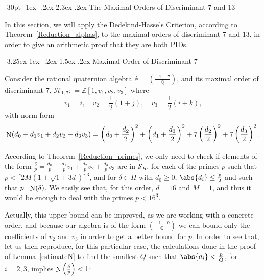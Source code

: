 \documentclass[10pt]{article}
\makeatletter
\renewcommand\section{\@startsection {section}{1}{\z@} {-30pt \@plus
    -1ex \@minus -.2ex} {2.3ex \@plus.2ex}
  {\normalfont\normalsize\bfseries\boldmath}}
\renewcommand\subsection{\@startsection{subsection}{2}{\z@}
  {-3.25ex\@plus -1ex \@minus -.2ex} {1.5ex \@plus .2ex}
  {\normalfont\normalsize\bfseries\boldmath}}
\theoremstyle{definition}
\newcommand\A{\mathbb{A}}
\newcommand\QQ{\mathbb{Q}}
\newcommand\ZZ{\mathbb{Z}}
\newcommand\hh{\mathcal{H}}
\newcommand\SC{\mathcal{S}}
\newcommand\N{\mathop{\rm N}\nolimits}
\makeatother
\begin{document}
\section{The Maximal Orders of Discriminant 7 and
  13}\label{orders7and13}

In this section, we will apply the Dedekind-Hasse's Criterion,
according to Theorem~\ref{Reduction_alphas}, to the maximal orders of
discriminant 7 and 13, in order to give an arithmetic proof that they
are both PIDs.

\subsection{Maximal Order of Discriminant 7}

Consider the rational quaternion algebra
$\A = \left( \frac{-1,-7}{\QQ} \right)$, and its maximal order of
discriminant 7, $\hh_{1,7} ;= \ZZ[1, v_1,v_2,v_3]$ where
\[ v_1= i, \quad v_2 = \frac{1}{2} (1+j), \quad v_3 =
  \frac{1}{2}(i+k),\] with norm form
%
\small
\[ \N( d_0 + d_1 v_1 + d_2 v_2 + d_3 v_3 ) = \left( d_0 +
    \frac{d_2}{2} \right)^2 + \left( d_1 + \frac{d_3}{2} \right)^2 + 7
  \left( \frac{d_2}{2} \right)^2 + 7 \left( \frac{d_3}{2} \right)^2.\]
%
\normalsize

According to Theorem~\ref{Reduction_primes}, we only need to check if
elements of the form
$\frac{\delta}{p}= \frac{d_0}{p} + \frac{d_1}{p} v_1 + \frac{d_2}{p}
v_2 + \frac{d_3}{p} v_3$ are in $ \SC_H$, for each of the primes $p$
such that $ p <\lceil 2 M(1+\sqrt{1+3d}) \rceil^3$, and for
$\delta \in H$ with $d_0\geq 0$, $\abs{d_i} \leq \frac{p}{2}$ and such
that $p \mid \N(\delta)$.  We easily see that, for this order, $d=16$
and $M=1$, and thus it would be enough to deal with the primes
$p < 16^3$.

Actually, this upper bound can be improved, as we are working with a
concrete order, and because our algebra is of the form
$\left( \frac{-1,-b}{\QQ} \right)$ we can bound only the coefficients
of $v_2$ and $v_3$ in order to get a better bound for $p$. In order to
see that, let us then reproduce, for this particular case, the
calculations done in the proof of Lemma~\ref{estimateN} to find the
smallest $Q$ such that $\abs{d_i} < \frac{p}Q$, for $i=2,3$, implies
$\N \left( \frac{\delta}{p} \right) <1$:
\end{document}
